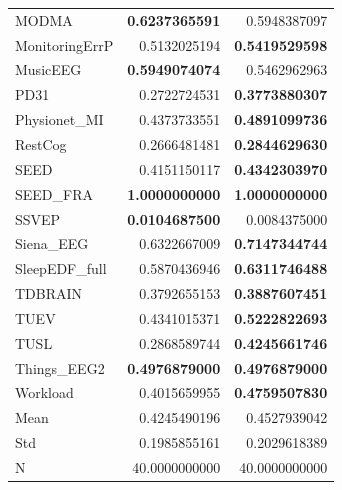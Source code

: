 \begin{table}[htbp]
\begin{tabular}{lrr}
MODMA & \bfseries 0.6237365591 & 0.5948387097 \\
MonitoringErrP & 0.5132025194 & \bfseries 0.5419529598 \\
MusicEEG & \bfseries 0.5949074074 & 0.5462962963 \\
PD31 & 0.2722724531 & \bfseries 0.3773880307 \\
Physionet_MI & 0.4373733551 & \bfseries 0.4891099736 \\
RestCog & 0.2666481481 & \bfseries 0.2844629630 \\
SEED & 0.4151150117 & \bfseries 0.4342303970 \\
SEED_FRA & \bfseries 1.0000000000 & \bfseries 1.0000000000 \\
SSVEP & \bfseries 0.0104687500 & 0.0084375000 \\
Siena_EEG & 0.6322667009 & \bfseries 0.7147344744 \\
SleepEDF_full & 0.5870436946 & \bfseries 0.6311746488 \\
TDBRAIN & 0.3792655153 & \bfseries 0.3887607451 \\
TUEV & 0.4341015371 & \bfseries 0.5222822693 \\
TUSL & 0.2868589744 & \bfseries 0.4245661746 \\
Things_EEG2 & \bfseries 0.4976879000 & \bfseries 0.4976879000 \\
Workload & 0.4015659955 & \bfseries 0.4759507830 \\
Mean & 0.4245490196 & 0.4527939042 \\
Std & 0.1985855161 & 0.2029618389 \\
N & 40.0000000000 & 40.0000000000 \\
\bottomrule
\end{tabular}
\end{table}
